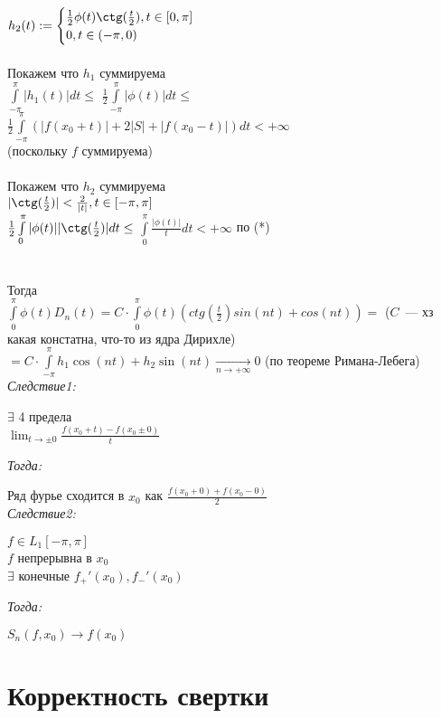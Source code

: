 \documentclass[paper=a4, fontsize=17pt]{article}
\begin{document}
$ h_2(t) := 
    \begin{cases}
        \frac{1}{2} \phi(t) \ctg(\frac{t}{2}), t \in [0, \pi] \\
        0, t \in (-\pi,0)
    \end{cases}
$
\\\\
Покажем что $ h_1 $ суммируема \\
$ \int\limits_{-\pi}^{\pi} |h_1(t)| dt \leq $
$ \frac{1}{2} \int\limits_{-\pi}^{\pi} |\phi(t)| dt \leq $
$ \frac{1}{2} \int\limits_{-\pi}^{\pi} (|f(x_0 + t)| + 2|S| + |f(x_0 - t)|) dt < +\infty $\\
(поскольку $f$ суммируема)
\\\\
Покажем что $ h_2 $ суммируема \\
$ |\ctg(\frac{t}{2})| < \frac{2}{|t|}, t \in [-\pi, \pi] $\\
$ \frac{1}{2} \int\limits_{0}^{\pi} |\phi(t)| |\ctg(\frac{t}{2})| dt \leq $
$ \int\limits_{0}^{\pi} \frac{|\phi(t)|}{t} dt < +\infty $ по (*)\\
\\\\
Тогда \\
$ \int\limits_0^\pi \phi(t)D_n(t) = C \cdot \int\limits_0^\pi \phi(t)(ctg(\frac{t}{2}) sin(nt) + cos(nt)) =$ ($C$~--- хз какая констатна, что-то из ядра Дирихле)\\
$= C \cdot \int\limits_{-\pi}^\pi h_1\cos(nt) + h_2\sin(nt) \xrightarrow[n \to +\infty]{} 0 $ (по теореме Римана-Лебега)\\

\emph{Следствие1:}

$ \exists $ 4 предела\\
$ \lim_{t \to \pm 0} \frac{f(x_0 + t) - f(x_0 \pm 0)}{t} $

\emph{Тогда:}

Ряд фурье сходится в $ x_0 $ как $ \frac{f(x_0 + 0) + f(x_0 - 0)}{2} $\\

\emph{Следствие2:}

$ f \in L_1[-\pi, \pi] $\\
$ f $ непрерывна в  $ x_0 $\\
$ \exists $ конечные $ f_{+}'(x_0), f_{-}'(x_0) $

\emph{Тогда:}

$ S_n(f, x_0) \to f(x_0) $

\section{Корректность свертки}
\end{document}
